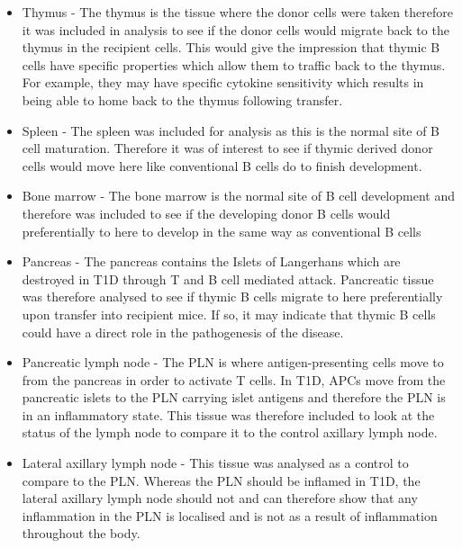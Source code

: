 \begin{itemize}
\item Thymus - The thymus is the tissue where the donor cells were taken therefore it was included in analysis to see if the donor cells would migrate back to the thymus in the recipient cells.
This would give the impression that thymic B cells have specific properties which allow them to traffic back to the thymus.
For example, they may have specific cytokine sensitivity which results in being able to home back to the thymus following transfer.
\item Spleen - The spleen was included for analysis as this is the normal site of B cell maturation.
Therefore it was of interest to see if thymic derived donor cells would move here like conventional B cells do to finish development.
\item Bone marrow - The bone marrow is the normal site of B cell development and therefore was included to see if the developing donor B cells would preferentially to here to develop in the same way as conventional B cells
\item Pancreas - The pancreas contains the Islets of Langerhans which are destroyed in T1D through T and B cell mediated attack.
Pancreatic tissue was therefore analysed to see if thymic B cells migrate to here preferentially upon transfer into recipient mice.
If so, it may indicate that thymic B cells could have a direct role in the pathogenesis of the disease.
\item Pancreatic lymph node - The PLN is where antigen-presenting cells move to from the pancreas in order to activate T cells.
In T1D, APCs move from the pancreatic islets to the PLN carrying islet antigens and therefore the PLN is in an inflammatory state.
This tissue was therefore included to look at the status of the lymph node to compare it to the control axillary lymph node.
\item Lateral axillary lymph node - This tissue was analysed as a control to compare to the PLN.
Whereas the PLN should be inflamed in T1D, the lateral axillary lymph node should not and can therefore show that any inflammation in the PLN is localised and is not as a result of inflammation throughout the body.
\end{itemize}


